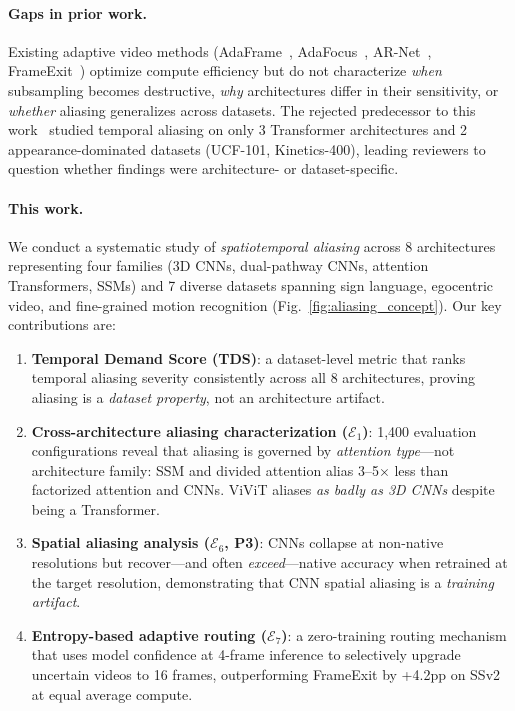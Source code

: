 \documentclass[runningheads]{llncs}
\newcommand{\TDS}{\textsc{TDS}}
\newcommand{\Eone}{$\mathcal{E}_1$}
\newcommand{\Esix}{$\mathcal{E}_6$}
\newcommand{\Eseven}{$\mathcal{E}_7$}
\begin{document}
\paragraph{Gaps in prior work.}
Existing adaptive video methods (AdaFrame~\cite{wu2019adaframe},
AdaFocus~\cite{wang2021adafocus}, AR-Net~\cite{meng2020arnet},
FrameExit~\cite{ghodrati2021frameexit}) optimize compute efficiency but do not
characterize \emph{when} subsampling becomes destructive, \emph{why} architectures
differ in their sensitivity, or \emph{whether} aliasing generalizes across datasets.
The rejected predecessor to this work~\cite{anon2612} studied temporal aliasing on
only 3 Transformer architectures and 2 appearance-dominated datasets
(UCF-101, Kinetics-400), leading reviewers to question whether findings were
architecture- or dataset-specific.

\paragraph{This work.}
We conduct a systematic study of \emph{spatiotemporal aliasing} across 8 architectures
representing four families (3D CNNs, dual-pathway CNNs, attention Transformers, SSMs)
and 7 diverse datasets spanning sign language, egocentric video, and fine-grained
motion recognition (Fig.~\ref{fig:aliasing_concept}).
Our key contributions are:
\begin{enumerate}[leftmargin=*,topsep=2pt,itemsep=2pt]
\item \textbf{Temporal Demand Score (\TDS{})}: a dataset-level metric that ranks temporal
aliasing severity consistently across all 8 architectures, proving aliasing is a
\emph{dataset property}, not an architecture artifact.
\item \textbf{Cross-architecture aliasing characterization (\Eone{})}: 1,400 evaluation
configurations reveal that aliasing is governed by \emph{attention type}—not architecture
family: SSM and divided attention alias 3--5$\times$ less than factorized attention
and CNNs. ViViT aliases \emph{as badly as 3D CNNs} despite being a Transformer.
\item \textbf{Spatial aliasing analysis (\Esix{}, P3)}: CNNs collapse at non-native
resolutions but recover—and often \emph{exceed}—native accuracy when retrained at the
target resolution, demonstrating that CNN spatial aliasing is a \emph{training artifact}.
\item \textbf{Entropy-based adaptive routing (\Eseven{})}: a zero-training routing
mechanism that uses model confidence at 4-frame inference to selectively upgrade uncertain
videos to 16 frames, outperforming FrameExit by +4.2pp on SSv2 at equal average compute.
\end{enumerate}
\end{document}
